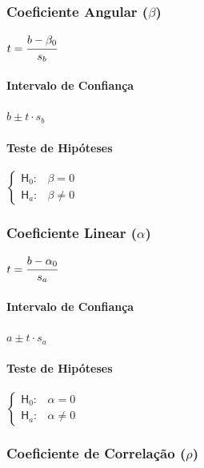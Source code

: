 		\subsubsection{Coeficiente Angular ($ \beta $)}

			{\Large $ t = \cfrac{b - \beta_{0}}{s_{b}} $}

			\paragraph{Intervalo de Confiança}

				{\Large $ b \pm t \cdot s_{b} $}

			\paragraph{Teste de Hipóteses}

				$
					\begin{cases}
			        \mathsf{H}_{0} : & \beta = 0 \\
			        \mathsf{H}_{a} : & \beta \neq 0
			        \end{cases}
				$

		\subsubsection{Coeficiente Linear ($ \alpha $)}

			{\Large $ t = \cfrac{b - \alpha_{0}}{s_{a}} $}

			\paragraph{Intervalo de Confiança}
				
				{\Large $ a \pm t \cdot s_{a} $}
				
			\paragraph{Teste de Hipóteses}

				$
					\begin{cases}
			        \mathsf{H}_{0} : & \alpha = 0 \\
			        \mathsf{H}_{a} : & \alpha \neq 0
			        \end{cases}
				$

		\subsubsection{Coeficiente de Correlação ($ \rho $)}

